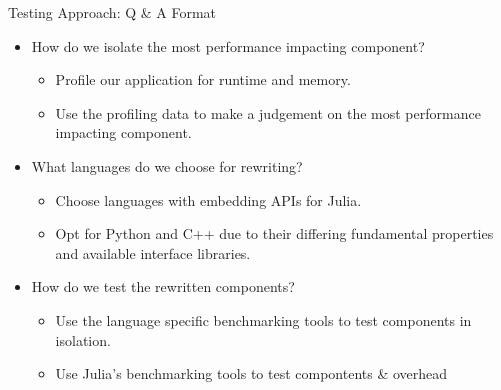 \begin{frame}{Testing Approach: Q \& A Format}
    \begin{itemize}
        \item How do we isolate the most performance impacting component?
        \begin{itemize}
            \item Profile our application for runtime and memory.
            \item Use the profiling data to make a judgement on the most performance impacting component.
        \end{itemize}
        \pause
        \item What languages do we choose for rewriting?
        \begin{itemize}
            \item Choose languages with embedding APIs for Julia. 
            \item Opt for Python and C++ due to their differing fundamental properties and available interface libraries.
        \end{itemize}
        \pause
        \item How do we test the rewritten components?
        \begin{itemize}
            \item Use the language specific benchmarking tools to test components in isolation.
            \item Use Julia's benchmarking tools to test compontents \& overhead 
        \end{itemize}
    \end{itemize}
\end{frame}